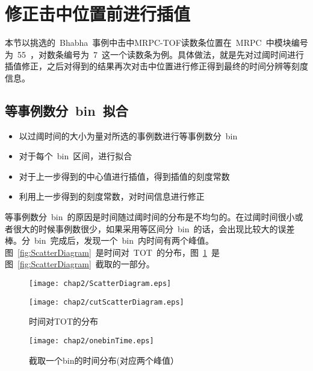 \section{修正击中位置前进行插值}

本节以挑选的~Bhabha~事例中击中MRPC-TOF读数条位置在~MRPC~中模块编号为~55~，对数条编号为~7~这一个读数条为例。具体做法，就是先对过阈时间进行插值修正，之后对得到的结果再次对击中位置进行修正得到最终的时间分辨等刻度信息。
\subsection{等事例数分~bin~拟合}
\begin{itemize}
    \item 以过阈时间的大小为量对所选的事例数进行等事例数分~bin~
    \item 对于每个~bin~区间，进行拟合
    \item 对于上一步得到的中心值进行插值，得到插值的刻度常数
    \item 利用上一步得到的刻度常数，对时间信息进行修正 
\end{itemize}
等事例数分~bin~的原因是时间随过阈时间的分布是不均匀的。在过阈时间很小或者很大的时候事例数很少，如果采用等区间分~bin~的话，会出现比较大的误差棒。分~bin~完成后，发现一个~bin~内时间有两个峰值。图~\ref{fig:ScatterDiagram}~是时间对~TOT~的分布，图~\ref{fig:cutScatterDiagram}~是图~\ref{fig:ScatterDiagram}~截取的一部分。

\begin{figure}[htbp]
\begin{minipage}[t]{0.5\linewidth}
\texttt{[image: chap2/ScatterDiagram.eps]}
\label{fig:ScatterDiagram}
\end{minipage}%
\hfill
\begin{minipage}[t]{0.5\linewidth}
\texttt{[image: chap2/cutScatterDiagram.eps]}
\label{fig:cutScatterDiagram}
\end{minipage}
\caption{时间对TOT的分布}
\end{figure}

\begin{figure}[htbp]
\centering
\texttt{[image: chap2/onebinTime.eps]}
\caption{截取一个bin的时间分布(对应两个峰值）}
\label{fig:onebinTime}
\end{figure}

